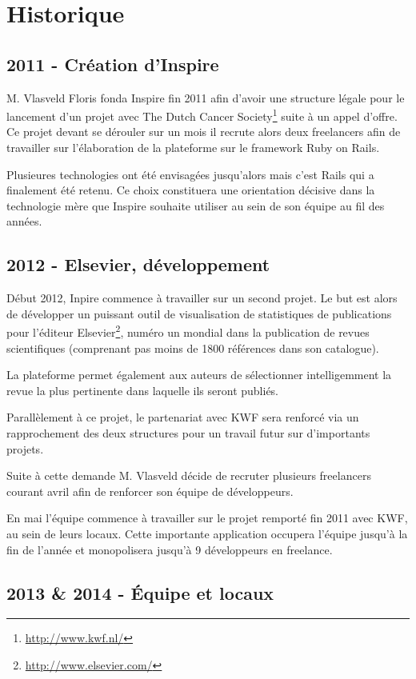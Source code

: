 \documentclass[12pt,a4paper]{book}
\begin{document}
\section{Historique}
\subsection{2011 - Création d'Inspire}

M. Vlasveld Floris fonda Inspire fin 2011 afin d'avoir une structure légale pour le lancement d'un projet avec The Dutch Cancer Society\footnote{\url{http://www.kwf.nl/}} suite à un appel d'offre. Ce projet devant se dérouler sur un mois il recrute alors deux freelancers afin de travailler sur l'élaboration de la plateforme sur le framework Ruby on Rails.

Plusieures technologies ont été envisagées jusqu'alors mais c'est Rails qui a finalement été retenu. Ce choix constituera une orientation décisive dans la technologie mère que Inspire souhaite utiliser au sein de son équipe au fil des années.

\subsection{2012 - Elsevier, développement}

Début 2012, Inpire commence à travailler sur un second projet. Le but est alors de développer un puissant outil de visualisation de statistiques de publications pour l'éditeur Elsevier\footnote{\url{http://www.elsevier.com/}}, numéro un mondial dans la publication de revues scientifiques (comprenant pas moins de 1800 références dans son catalogue).

La plateforme permet également aux auteurs de sélectionner intelligemment la revue la plus pertinente dans laquelle ils seront publiés.

Parallèlement à ce projet, le partenariat avec KWF sera renforcé via un rapprochement des deux structures pour un travail futur sur d'importants projets.

Suite à cette demande M. Vlasveld décide de recruter plusieurs freelancers courant avril afin de renforcer son équipe de développeurs.

En mai l'équipe commence à travailler sur le projet remporté fin 2011 avec KWF, au sein de leurs locaux. Cette importante application occupera l'équipe jusqu'à la fin de l'année et monopolisera jusqu'à 9 développeurs en freelance.

\subsection{2013 \& 2014 - Équipe et locaux}
\end{document}
